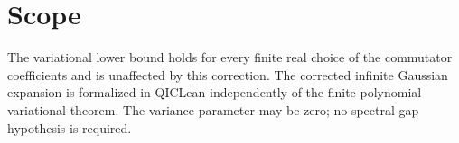 \documentclass{article}
\begin{document}
\section{Scope}
The variational lower bound holds for every finite real choice of the
commutator coefficients and is unaffected by this correction. The corrected infinite
Gaussian expansion is formalized in QICLean independently of the
finite-polynomial variational theorem. The variance parameter may be zero;
no spectral-gap hypothesis is required.


\end{document}
